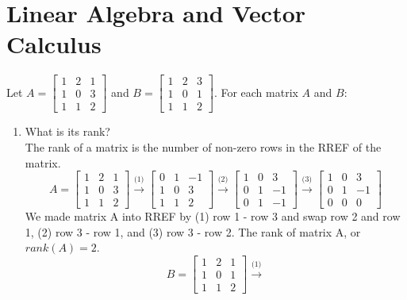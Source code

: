 \documentclass{article}
\begin{document}
\section*{Linear Algebra and Vector Calculus}
\begin{aprob}
    Let $A = \begin{bmatrix} 1 & 2 & 1 \\ 1 & 0 & 3 \\ 1 & 1 & 2 \end{bmatrix}$ and $B = \begin{bmatrix} 1 & 2 & 3 \\ 1 & 0 & 1 \\ 1 & 1 & 2 \end{bmatrix}$.
    For each matrix $A$ and $B$:
    \begin{enumerate} 
    	\item {} What is its rank?\\
    	The rank of a matrix is the number of non-zero rows in the RREF of the matrix.
    	\begin{equation}
    	    A = \begin{bmatrix} 1 & 2 & 1 \\ 1 & 0 & 3 \\ 1 & 1 & 2 \end{bmatrix} \xrightarrow{\text{(1)}} 
    	    \begin{bmatrix} 0 & 1 & -1 \\ 1 & 0 & 3 \\ 1 & 1 & 2 \end{bmatrix} \xrightarrow{\text{(2)}}
    	    \begin{bmatrix} 1 & 0 & 3 \\ 0 & 1 & -1 \\ 0 & 1 & -1 \end{bmatrix} \xrightarrow{\text{(3)}}
    	    \begin{bmatrix} 1 & 0 & 3 \\ 0 & 1 & -1 \\ 0 & 0 & 0 \end{bmatrix} 
    	\end{equation}
    	We made matrix A into RREF by (1) row 1 - row 3 and swap row 2 and row 1, (2) row 3 - row 1, and (3) row 3 - row 2. The rank of matrix A, or $rank(A) = 2$.
    	\begin{equation}
    	    B = \begin{bmatrix} 1 & 2 & 1 \\ 1 & 0 & 1 \\ 1 & 1 & 2 \end{bmatrix} \xrightarrow{\text{(1)}} 

\end{equation}
\end{enumerate}
\end{aprob}
\end{document}
